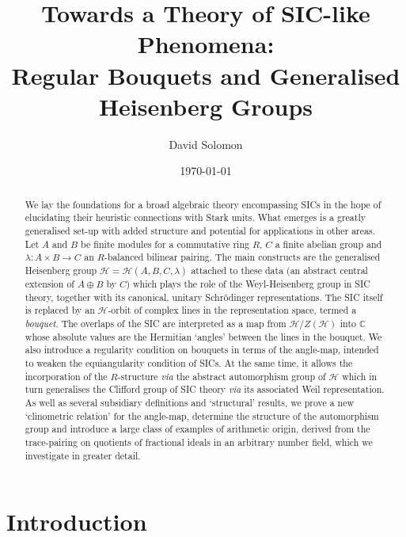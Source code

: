 \documentclass[12pt]{article}
\newcounter{example}[section]
\newcommand{\bbC}{\ensuremath{\mathbb{C}}}\newcommand{\bbCp}{\ensuremath{\mathbb{C}_p}}
\newcommand{\cH}{\ensuremath{\mathcal{H}}}
\newcommand{\Hei}[4]{\cH({#1},{#2},{#3},{#4})}
\newcommand{\HeiStan}{\Hei{A}{B}{C}{\lambda}}
\begin{document}
\title{Towards a Theory of SIC-like Phenomena:\\ %
Regular Bouquets and Generalised Heisenberg Groups}
\author{David Solomon}
\date{\today}
\maketitle
\begin{abstract} 
	\noindent We lay the foundations for a broad algebraic theory encompassing SICs in the hope of elucidating their heuristic connections with Stark units. What emerges is a greatly generalised set-up with added structure and potential for applications in other areas. Let $A$ and $B$ be finite modules for a commutative ring $R$, $C$ a finite abelian group and $\lambda: A\times B\rightarrow C$ an $R$-balanced bilinear pairing. The main constructs are the generalised Heisenberg group $\cH=\HeiStan$ attached to these data (an abstract central extension of $A\oplus B$ by $C$) which plays the role of the Weyl-Heisenberg group in SIC theory,  together with its canonical, unitary Schr\"odinger representations.
	The SIC itself is replaced by an $\cH$-orbit of complex lines  in the representation space, termed a \textit{bouquet}. The overlaps of the SIC are interpreted as a map from $\cH/Z(\cH)$ into $\bbC$ whose absolute values are the Hermitian `angles' between the lines in the bouquet. We also introduce a regularity condition on bouquets in terms of the angle-map, intended to weaken the equiangularity condition of SICs. At the same time, it allows the incorporation of the $R$-structure \textit{via} the abstract automorphism group of $\cH$ which in turn generalises the Clifford group of SIC theory \textit{via} its associated Weil representation. As well as several subsidiary definitions and `structural' results, we prove a new `clinometric relation' for the angle-map, determine the structure of the automorphism group and introduce a large class of examples of arithmetic origin, derived from the trace-pairing on quotients of fractional ideals in an arbitrary number field, which we investigate in greater detail. 
\end{abstract}
\section{Introduction}
\end{document}
